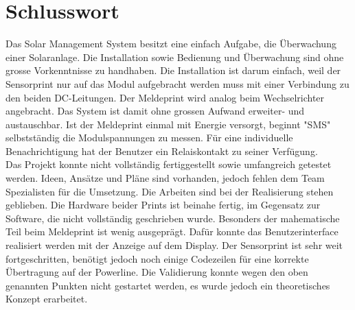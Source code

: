 \section{Schlusswort}
Das Solar Management System besitzt eine einfach Aufgabe, die Überwachung einer Solaranlage. Die Installation sowie Bedienung und Überwachung sind ohne grosse Vorkenntnisse zu handhaben. Die Installation ist darum einfach, weil der Sensorprint nur auf das Modul aufgebracht werden muss mit einer Verbindung zu den beiden DC-Leitungen. Der Meldeprint wird analog beim Wechselrichter angebracht. Das System ist damit ohne grossen Aufwand erweiter- und austauschbar. Ist der Meldeprint einmal mit Energie versorgt, beginnt "SMS" selbstständig die Modulspannungen zu messen. Für eine individuelle Benachrichtigung hat der Benutzer ein Relaiskontakt zu seiner Verfügung.\\
Das Projekt konnte nicht vollständig fertiggestellt sowie umfangreich getestet werden. Ideen, Ansätze und Pläne sind vorhanden, jedoch fehlen dem Team Spezialisten für die Umsetzung. Die Arbeiten sind bei der Realisierung stehen geblieben. Die Hardware beider Prints ist beinahe fertig, im Gegensatz zur Software, die nicht vollständig geschrieben wurde. Besonders der mahematische Teil beim Meldeprint ist wenig ausgeprägt. Dafür konnte das Benutzerinterface realisiert werden mit der Anzeige auf dem Display. Der Sensorprint ist sehr weit fortgeschritten, benötigt jedoch noch einige Codezeilen für eine korrekte Übertragung auf der Powerline.  Die Validierung konnte wegen den oben genannten Punkten nicht gestartet werden, es wurde jedoch ein theoretisches Konzept erarbeitet.